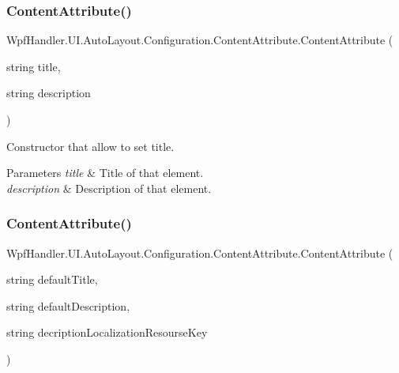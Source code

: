\subsubsection{\texorpdfstring{Content\+Attribute()}{ContentAttribute()}\hspace{0.1cm}{\footnotesize\ttfamily [3/5]}}
{\footnotesize\ttfamily Wpf\+Handler.\+U\+I.\+Auto\+Layout.\+Configuration.\+Content\+Attribute.\+Content\+Attribute (\begin{DoxyParamCaption}\item[{string}]{title,  }\item[{string}]{description }\end{DoxyParamCaption})}



Constructor that allow to set title. 


\begin{DoxyParams}{Parameters}
{\em title} & Title of that element.\\
\hline
{\em description} & Description of that element.\\
\hline
\end{DoxyParams}
\mbox{\label{class_wpf_handler_1_1_u_i_1_1_auto_layout_1_1_configuration_1_1_content_attribute_ab0c84b73301dd184abc00bbf5204c178}} 
\subsubsection{\texorpdfstring{Content\+Attribute()}{ContentAttribute()}\hspace{0.1cm}{\footnotesize\ttfamily [4/5]}}
{\footnotesize\ttfamily Wpf\+Handler.\+U\+I.\+Auto\+Layout.\+Configuration.\+Content\+Attribute.\+Content\+Attribute (\begin{DoxyParamCaption}\item[{string}]{default\+Title,  }\item[{string}]{default\+Description,  }\item[{string}]{decription\+Localization\+Resourse\+Key }\end{DoxyParamCaption})}



